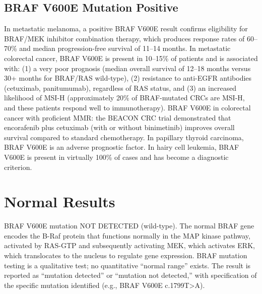 \subsection*{BRAF V600E Mutation Positive}
In metastatic melanoma, a positive BRAF V600E result confirms eligibility for BRAF/MEK inhibitor combination therapy, which produces response rates of 60--70\% and median progression-free survival of 11--14 months. In metastatic colorectal cancer, BRAF V600E is present in 10--15\% of patients and is associated with: (1) a very poor prognosis (median overall survival of 12--18 months versus 30+ months for BRAF/RAS wild-type), (2) resistance to anti-EGFR antibodies (cetuximab, panitumumab), regardless of RAS status, and (3) an increased likelihood of MSI-H (approximately 20\% of BRAF-mutated CRCs are MSI-H, and these patients respond well to immunotherapy). BRAF V600E in colorectal cancer with proficient MMR: the BEACON CRC trial demonstrated that encorafenib plus cetuximab (with or without binimetinib) improves overall survival compared to standard chemotherapy. In papillary thyroid carcinoma, BRAF V600E is an adverse prognostic factor. In hairy cell leukemia, BRAF V600E is present in virtually 100\% of cases and has become a diagnostic criterion.

\section*{Normal Results}
BRAF V600E mutation NOT DETECTED (wild-type). The normal BRAF gene encodes the B-Raf protein that functions normally in the MAP kinase pathway, activated by RAS-GTP and subsequently activating MEK, which activates ERK, which translocates to the nucleus to regulate gene expression. BRAF mutation testing is a qualitative test; no quantitative ``normal range'' exists. The result is reported as ``mutation detected'' or ``mutation not detected,'' with specification of the specific mutation identified (e.g., BRAF V600E c.1799T>A).

